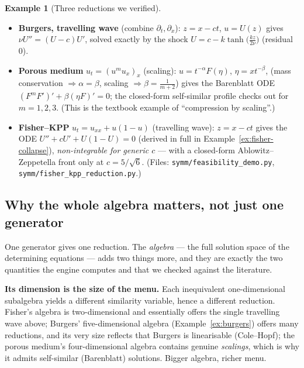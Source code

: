 \documentclass[11pt]{article}
\theoremstyle{definition}
\newtheorem{example}{Example}[section]
\theoremstyle{remark}
\begin{document}
\begin{example}[Three reductions we verified]\label{ex:reductions}
\leavevmode
\begin{itemize}[nosep]
  \item \textbf{Burgers, travelling wave} (combine $\partial_t,\partial_x$): $z=x-ct$, $u=U(z)$ gives
        $\nu U''=(U-c)U'$, solved exactly by the shock $U=c-k\tanh\!\big(\tfrac{kz}{2\nu}\big)$
        (residual $0$).
  \item \textbf{Porous medium} $u_t=(u^m u_x)_x$ (scaling): $u=t^{-\alpha}F(\eta)$, $\eta=xt^{-\beta}$,
        (mass conservation $\Rightarrow\alpha=\beta$, scaling $\Rightarrow\beta=\tfrac1{m+2}$) gives the Barenblatt ODE $(F^mF')'+\beta(\eta F)'=0$; the closed-form
        self-similar profile checks out for $m=1,2,3$. (This is the textbook example of
        ``compression by scaling''.)
  \item \textbf{Fisher--KPP} $u_t=u_{xx}+u(1-u)$ (travelling wave): $z=x-ct$ gives the
        ODE $U''+cU'+U(1-U)=0$ (derived in full in Example~\ref{ex:fisher-collapse}), \emph{non-integrable for generic $c$} --- with a closed-form Ablowitz--Zeppetella front only at
        $c=5/\sqrt6$. (Files: \texttt{symm/feasibility\_demo.py}, \texttt{symm/fisher\_kpp\_reduction.py}.)
\end{itemize}
\end{example}

\subsection{Why the whole algebra matters, not just one generator}\label{sec:whole-algebra}

One generator gives one reduction. The \emph{algebra} --- the full solution space of the determining
equations --- adds two things more, and they are exactly the two quantities the engine computes and that
we checked against the literature.

\textbf{Its dimension is the size of the menu.} Each inequivalent one-dimensional subalgebra yields a
different similarity variable, hence a different reduction. Fisher's algebra is two-dimensional and
essentially offers the single travelling wave above; Burgers' five-dimensional algebra
(Example~\ref{ex:burgers}) offers many reductions, and its very size reflects that Burgers is
linearisable (Cole--Hopf); the porous medium's four-dimensional algebra contains genuine \emph{scalings},
which is why it admits self-similar (Barenblatt) solutions. Bigger algebra, richer menu.
\end{document}

